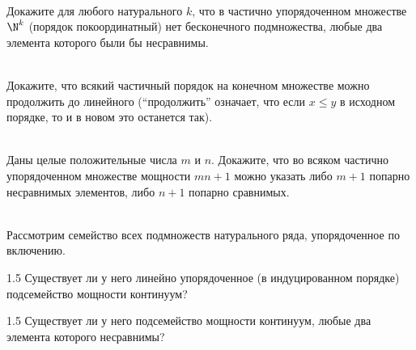 \documentclass[a4paper,12pt,twoside]{article}
\begin{document}
\begin{?}\ \\
     Докажите для любого натурального $k$, что в частично упорядоченном множестве $\N^k$ (порядок покоординатный) нет бесконечного подмножества, любые два элемента которого были бы несравнимы.
\end{?}
\begin{?}\ \\
     Докажите, что всякий частичный порядок на конечном множестве можно продолжить до линейного (\enquote{продолжить} означает, что если $x \leq y$ в исходном  порядке, то и в новом это останется так).
\end{?}
\begin{?}\ \\
     Даны целые положительные числа $m$ и $n$. Докажите, что во всяком частично упорядоченном множестве мощности $mn + 1$ можно указать либо $m + 1$ попарно несравнимых элементов, либо $n + 1$ попарно сравнимых.
\end{?}
\begin{?}\ \\
    Рассмотрим семейство всех подмножеств натурального ряда, упорядоченное по включению.
    \begin{tasklist}
        \item[1.5]  Существует ли у него линейно упорядоченное (в индуцированном порядке) подсемейство мощности континуум?
        \item[1.5] Существует ли у него подсемейство мощности континуум, любые два элемента которого несравнимы?
    \end{tasklist}
\end{?}
\end{document}
